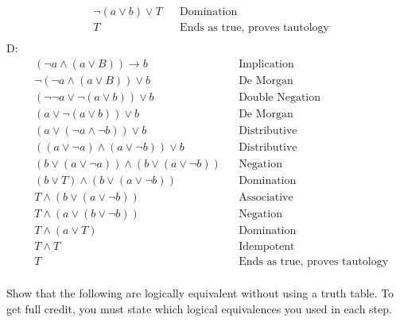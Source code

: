 \documentclass[10pt]{exam}
\begin{document}
\begin{questions}
\begin{solution}
\begin{align*}
        &\lnot(a \lor b) \lor T
        && \text{Domination} \\[2pt]
        &T
        && \text{Ends as true, proves tautology} \\[2pt]
    \end{align*}
    D:
    \begin{align*}
        &(\lnot a \land (a \lor B)) \rightarrow b
        && \text{Implication} \\[2pt]
        &\lnot(\lnot a \land (a \lor B)) \lor b
        && \text{De Morgan} \\[2pt]
        &(\lnot\lnot a \lor \lnot(a \lor b)) \lor b
        && \text{Double Negation} \\[2pt]
        &(a \lor \lnot(a \lor b)) \lor b
        && \text{De Morgan} \\[2pt]
        &(a \lor (\lnot a \land \lnot b)) \lor b
        && \text{Distributive} \\[2pt]
        &((a \lor \lnot a) \land (a \lor \lnot b)) \lor b
        && \text{Distributive} \\[2pt]
        &(b \lor (a \lor \lnot a)) \land (b \lor (a \lor \lnot b))
        && \text{Negation} \\[2pt]
        &(b \lor T) \land (b \lor (a \lor \lnot b))
        && \text{Domination} \\[2pt]
        &T \land (b \lor (a \lor \lnot b))
        && \text{Associative} \\[2pt]
        &T \land (a \lor (b \lor \lnot b))
        && \text{Negation} \\[2pt]
        &T \land (a \lor T)
        && \text{Domination} \\[2pt]
        &T \land T
        && \text{Idempotent} \\[2pt]
        &T
        && \text{Ends as true, proves tautology} \\[2pt]
    \end{align*}
    
\end{solution}

\question[8] Show that the following are logically equivalent without using a truth table. To get full credit, you must state which logical equivalences you used in each step.

\end{questions}
\end{document}

